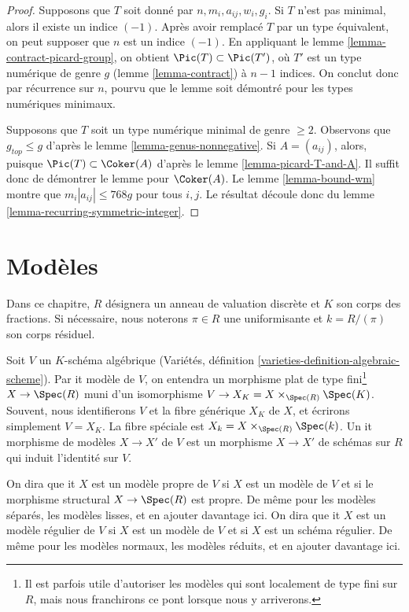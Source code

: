\begin{proof}
Supposons que $T$ soit donné par $n, m_i, a_{ij}, w_i, g_i$.
Si $T$ n'est pas minimal, alors il existe un indice $(-1)$.
Après avoir remplacé $T$ par un type équivalent, on peut supposer que
$n$ est un indice $(-1)$. En appliquant le lemme \ref{lemma-contract-picard-group},
on obtient $\Pic(T) \subset \Pic(T')$, où $T'$
est un type numérique de genre $g$ (lemme \ref{lemma-contract})
à $n - 1$ indices. On conclut donc par récurrence sur $n$,
pourvu que le lemme soit démontré pour les types numériques minimaux.

\medskip\noindent
Supposons que $T$ soit un type numérique minimal de genre $\geq 2$.
Observons que $g_{top} \leq g$ d'après le lemme \ref{lemma-genus-nonnegative}.
Si $A = (a_{ij})$, alors, puisque $\Pic(T) \subset \Coker(A)$
d'après le lemme \ref{lemma-picard-T-and-A}. Il suffit donc de démontrer
le lemme pour $\Coker(A)$.
Le lemme \ref{lemma-bound-wm} montre que $m_i|a_{ij}| \leq 768g$ pour
tous $i, j$.
Le résultat découle donc du lemme \ref{lemma-recurring-symmetric-integer}.
\end{proof}







\section{Modèles}
\label{section-models}

\noindent
Dans ce chapitre, $R$ désignera un anneau de valuation discrète et $K$ son
corps des fractions. Si nécessaire, nous noterons $\pi \in R$ une
uniformisante et $k = R/(\pi)$ son corps résiduel.

\medskip\noindent
Soit $V$ un $K$-schéma algébrique
(Variétés, définition \ref{varieties-definition-algebraic-scheme}).
Par {it modèle} de $V$, on entendra un morphisme plat de type
fini\footnote{Il est parfois utile d'autoriser les modèles qui sont
localement de type fini sur $R$, mais nous franchirons
ce pont lorsque nous y arriverons.}
$X \to \Spec(R)$ muni d'un
isomorphisme $V \to X_K = X \times_{\Spec(R)} \Spec(K)$. Souvent, nous
identifierons $V$ et la fibre générique $X_K$ de $X$, et
écrirons simplement $V = X_K$.
La fibre spéciale est $X_k = X \times_{\Spec(R)} \Spec(k)$.
Un {it morphisme de modèles $X \to X'$ de $V$}
est un morphisme $X \to X'$ de schémas sur $R$ qui induit
l'identité sur $V$.

\medskip\noindent
On dira que {it $X$ est un modèle propre de $V$} si $X$ est un modèle
de $V$ et si le morphisme structural $X \to \Spec(R)$ est propre.
De même pour les modèles séparés, les modèles lisses, et en ajouter davantage ici.
On dira que {it $X$ est un modèle régulier de $V$} si $X$ est un modèle
de $V$ et si $X$ est un schéma régulier.
De même pour les modèles normaux, les modèles réduits, et en ajouter davantage ici.

